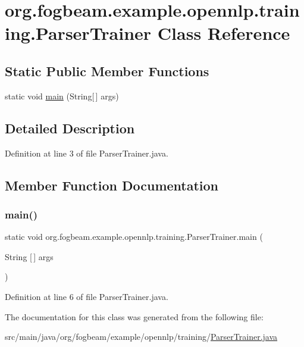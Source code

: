 \hypertarget{classorg_1_1fogbeam_1_1example_1_1opennlp_1_1training_1_1_parser_trainer}{}\section{org.\+fogbeam.\+example.\+opennlp.\+training.\+Parser\+Trainer Class Reference}
\label{classorg_1_1fogbeam_1_1example_1_1opennlp_1_1training_1_1_parser_trainer}
\subsection*{Static Public Member Functions}
\begin{DoxyCompactItemize}
\item 
static void \hyperlink{classorg_1_1fogbeam_1_1example_1_1opennlp_1_1training_1_1_parser_trainer_a518b46c400eae7dc70f42f616eb84db4}{main} (String\mbox{[}$\,$\mbox{]} args)
\end{DoxyCompactItemize}


\subsection{Detailed Description}


Definition at line 3 of file Parser\+Trainer.\+java.



\subsection{Member Function Documentation}
\hypertarget{classorg_1_1fogbeam_1_1example_1_1opennlp_1_1training_1_1_parser_trainer_a518b46c400eae7dc70f42f616eb84db4}{}\label{classorg_1_1fogbeam_1_1example_1_1opennlp_1_1training_1_1_parser_trainer_a518b46c400eae7dc70f42f616eb84db4} 
\subsubsection{\texorpdfstring{main()}{main()}}
{\footnotesize\ttfamily static void org.\+fogbeam.\+example.\+opennlp.\+training.\+Parser\+Trainer.\+main (\begin{DoxyParamCaption}\item[{String \mbox{[}$\,$\mbox{]}}]{args }\end{DoxyParamCaption})\hspace{0.3cm}{\ttfamily [static]}}



Definition at line 6 of file Parser\+Trainer.\+java.



The documentation for this class was generated from the following file\+:\begin{DoxyCompactItemize}
\item 
src/main/java/org/fogbeam/example/opennlp/training/\hyperlink{_parser_trainer_8java}{Parser\+Trainer.\+java}\end{DoxyCompactItemize}
